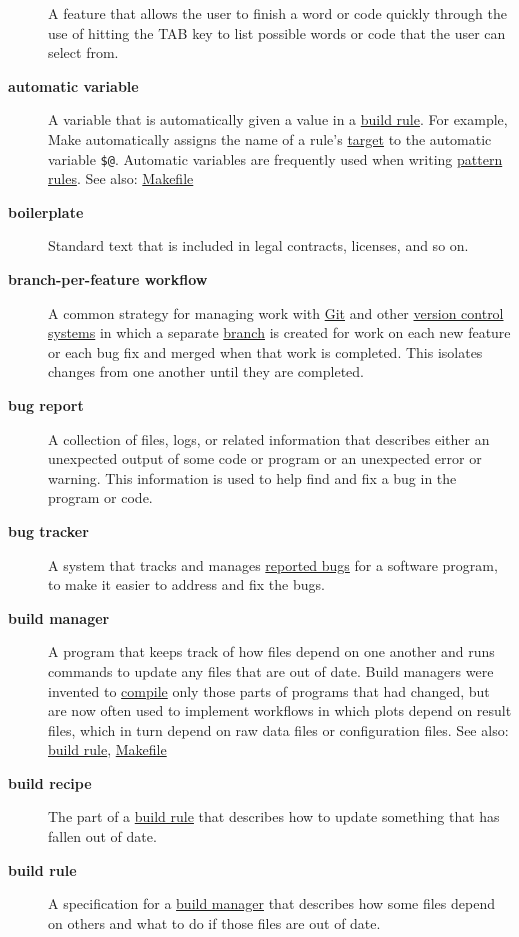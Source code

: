 \documentclass[
]{krantz}
\begin{document}
\begin{description}
A feature that allows the user to finish a word or code quickly through the use of hitting the TAB key to list possible words or code that the user can select from.
\item[\textbf{automatic variable}]
A variable that is automatically given a value in a \protect\hyperlink{build_rule}{build rule}. For example, Make automatically assigns the name of a rule's \protect\hyperlink{build_target}{target} to the automatic variable \texttt{\$@}. Automatic variables are frequently used when writing \protect\hyperlink{pattern_rule}{pattern rules}. See also: \protect\hyperlink{makefile}{Makefile}
\item[\textbf{boilerplate}]
Standard text that is included in legal contracts, licenses, and so on.
\item[\textbf{branch-per-feature workflow}]
A common strategy for managing work with \protect\hyperlink{git}{Git} and other \protect\hyperlink{version_control_system}{version control systems} in which a separate \protect\hyperlink{git_branch}{branch} is created for work on each new feature or each bug fix and merged when that work is completed. This isolates changes from one another until they are completed.
\item[\textbf{bug report}]
A collection of files, logs, or related information that describes either an unexpected output of some code or program or an unexpected error or warning. This information is used to help find and fix a bug in the program or code.
\item[\textbf{bug tracker}]
A system that tracks and manages \protect\hyperlink{bug_report}{reported bugs} for a software program, to make it easier to address and fix the bugs.
\item[\textbf{build manager}]
A program that keeps track of how files depend on one another and runs commands to update any files that are out of date. Build managers were invented to \protect\hyperlink{compile}{compile} only those parts of programs that had changed, but are now often used to implement workflows in which plots depend on result files, which in turn depend on raw data files or configuration files. See also: \protect\hyperlink{build_rule}{build rule}, \protect\hyperlink{makefile}{Makefile}
\item[\textbf{build recipe}]
The part of a \protect\hyperlink{build_rule}{build rule} that describes how to update something that has fallen out of date.
\item[\textbf{build rule}]
A specification for a \protect\hyperlink{build_manager}{build manager} that describes how some files depend on others and what to do if those files are out of date.

\end{description}
\end{document}
